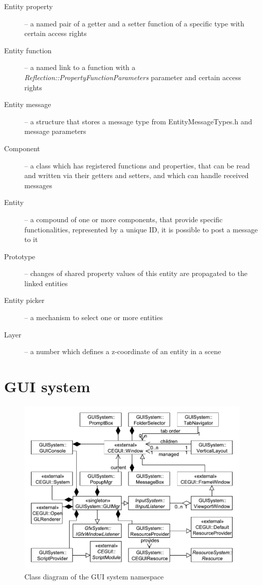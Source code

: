 \documentclass[a4paper, 12pt]{report}
\begin{document}
\begin{description}
  \item[Entity property] -- a named pair of a getter and a setter function of a specific type with certain access rights
  \item[Entity function] -- a named link to a function with a \emph{Reflection::Property\-FunctionParameters} parameter and certain access rights
  \item[Entity message] -- a structure that stores a message type from EntityMessageTypes.h and message parameters
  \item[Component] -- a class which has registered functions and properties, that can be read and written via their getters and setters, and which can handle received messages
  \item[Entity] -- a compound of one or more components, that provide specific functionalities, represented by a unique ID, it is possible to post a message to it
  \item[Prototype] -- changes of shared property values of this entity are propagated to the linked entities
  \item[Entity picker] -- a mechanism to select one or more entities
  \item[Layer] -- a number which defines a z-coordinate of an entity in a scene
\end{description}


\chapter{GUI system}

\begin{figure}[htbp]
	\centering
		\includegraphics[width=1\textwidth]{GUISystemClassDiagram.pdf}
	\caption{Class diagram of the GUI system namespace}
	\label{fig:guisystem-diagram}
\end{figure}
\end{document}
